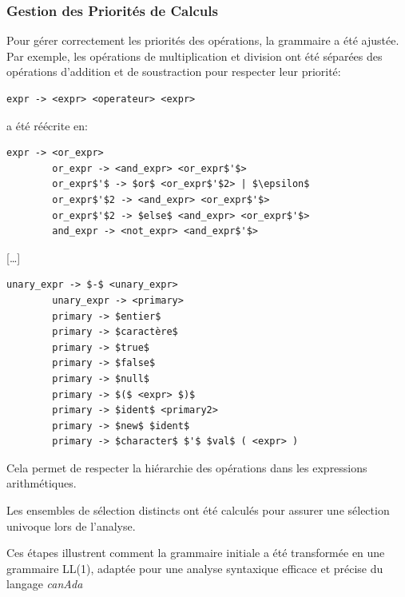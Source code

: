 \documentclass[french,a4paper]{article}
\begin{document}
    \subsubsection{Gestion des Priorités de Calculs}
    Pour gérer correctement les priorités des opérations, la grammaire a été ajustée.
    Par exemple, les opérations de multiplication et division ont été séparées des opérations d'addition et de soustraction pour respecter leur priorité:
    \begin{lstlisting}[label={lst:lstlisting6}]
        expr -> <expr> <operateur> <expr>
    \end{lstlisting}
    a été réécrite en:
    \begin{lstlisting}[label={lst:lstlisting7}]
        expr -> <or_expr>
        or_expr -> <and_expr> <or_expr$'$>
        or_expr$'$ -> $or$ <or_expr$'$2> | $\epsilon$
        or_expr$'$2 -> <and_expr> <or_expr$'$>
        or_expr$'$2 -> $else$ <and_expr> <or_expr$'$>
        and_expr -> <not_expr> <and_expr$'$>
    \end{lstlisting}
    [\dots]
    \begin{lstlisting}[label={lst:lstlisting8}]
        unary_expr -> $-$ <unary_expr>
        unary_expr -> <primary>
        primary -> $entier$
        primary -> $caractère$
        primary -> $true$
        primary -> $false$
        primary -> $null$
        primary -> $($ <expr> $)$
        primary -> $ident$ <primary2>
        primary -> $new$ $ident$
        primary -> $character$ $'$ $val$ ( <expr> )
    \end{lstlisting}
    Cela permet de respecter la hiérarchie des opérations dans les expressions arithmétiques.

    Les ensembles de sélection distincts ont été calculés pour assurer une sélection univoque lors de l'analyse.

    Ces étapes illustrent comment la grammaire initiale a été transformée en une grammaire LL(1), adaptée pour une analyse syntaxique efficace et précise du langage \textit{canAda}
\end{document}

